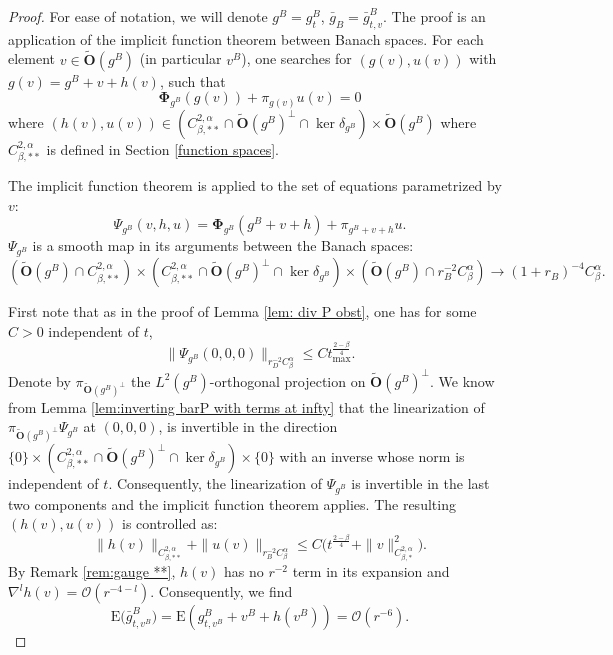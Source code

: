 \documentclass[11pt,reqno]{amsart}
\numberwithin{equation}{section}
\newcommand{\E}{\mathrm{E}}
\theoremstyle{definition}
\theoremstyle{remark}
\begin{document}
\begin{proof}
    For ease of notation, we will denote $g^B = g^B_{t }$, $\bar{g}_B=\bar{g}^B_{t ,v }$. The proof is an application of the implicit function theorem between Banach spaces. For each element $v\in \tilde{\mathbf{O}}(g^B)$ (in particular $v ^B$), one searches for $(g(v),u(v))$ with $g(v)=g^B+v+ h(v)$, such that 
$$\mathbf{\Phi}_{g^B}(g(v)) + \pi_{g(v)}u(v) = 0$$
where $(h(v),u(v))\in (C^{2,\alpha}_{\beta,**}\cap \tilde{\mathbf{O}}(g^B)^\perp\cap \ker{\delta_{g^B}})\times \tilde{\mathbf{O}}(g^B)$ where $C^{2,\alpha}_{\beta,**}$ is defined in Section \ref{function spaces}.

The implicit function theorem is applied to the set of equations parametrized by $v$:
$$ \Psi_{g^B}(v,h,u) = \mathbf{\Phi}_{g^B}(g^B +v +h) + \pi_{g^B +v +h}u. $$
$\Psi_{g^B}$ is a smooth map in its arguments between the Banach spaces:
$$\left(\tilde{\mathbf{O}}(g^B)\cap C^{2,\alpha}_{\beta,**}\right)\times \left(C^{2,\alpha}_{\beta,**}\cap \tilde{\mathbf{O}}(g^B)^\perp\cap \ker{\delta_{g^B}}\right)\times \left(\tilde{\mathbf{O}}(g^B)\cap r_B^{-2}C^{\alpha}_{\beta}\right)\to (1+r_B)^{-4}C^{\alpha}_{\beta}.$$

First note that as in the proof of Lemma \ref{lem: div P obst}, one has for some $C>0$ independent of $t$,
\begin{equation}\label{eq: Psi at gB}
    \|\Psi_{g^B}(0,0,0)\|_{r_D^{-2}C^\alpha_{\beta}} \leqslant C t_{\max}^{\frac{2-\beta}4}.
\end{equation}
Denote by $\pi_{\tilde{\mathbf{O}}(g^B)^\perp}$ the $L^2(g^B)$-orthogonal projection on $\tilde{\mathbf{O}}(g^B)^\perp$. We know from Lemma \ref{lem:inverting barP with terms at infty} that the linearization of $\pi_{\tilde{\mathbf{O}}(g^B)^\perp}\Psi_{g^B}$ at $(0,0,0)$, is invertible in the direction $\{0\}\times(C^{2,\alpha}_{\beta,**}\cap \tilde{\mathbf{O}}(g^B)^\perp\cap \ker{\delta_{g^B}})\times\{0\}$ with an inverse whose norm is independent of $t$. Consequently, the linearization of $\Psi_{g^B}$ is invertible in the last two components and the implicit function theorem applies. The resulting $(h(v),u(v))$ is controlled as:
$$ \|h(v)\|_{C^{2,\alpha}_{\beta,**}} + \|u(v)\|_{r_B^{-2}C^{\alpha}_{\beta}} \leqslant C \Big(t^{\frac{2-\beta}4}+ \|v\|_{C^{2,\alpha}_{\beta,*}}^2\Big). $$
By Remark \ref{rem:gauge **}, $h(v)$ has no $r^{-2}$ term in its expansion and $\nabla^lh(v)= \mathcal{O}(r^{-4-l})$. Consequently, we find $$\E\big(\bar{g}^B_{t ,v ^B}\big) =\E\left(g^B_{t ,v ^B} + v ^B +h(v ^B)\right) = \mathcal{O}(r^{-6}).$$
\end{proof}
\end{document}
